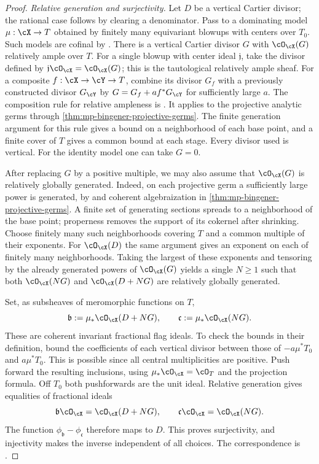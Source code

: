 \begin{proof}
\emph{Relative generation and surjectivity.}
Let $D$ be a vertical Cartier divisor; the rational case
follows by clearing a denominator. Pass to a dominating
model $\mu:\cX\to T$ obtained by finitely many equivariant
blowups with centers over $T_0$. Such models are cofinal
by \cite[Remark~2.5.2 and the proof of Theorem~2.6.4,
footnote~10]{MPTropicalV2}.
There is a vertical Cartier divisor $G$ with
$\cO_{\cX}(G)$ relatively ample over $T$. For a single
blowup with center ideal $\mathfrak j$, take the divisor
defined by $\mathfrak j\cO_{\cX}=\cO_{\cX}(G)$; this
is the tautological relatively ample sheaf. For a composite
$f:\cX\to\cY\to T$, combine its divisor $G_f$
with a previously constructed divisor $G_{\cY}$ by
$G=G_f+a f^*G_{\cY}$ for sufficiently large $a$.
The composition rule for relative ampleness is
\cite[Tag~0C4K]{stacks-project}. It applies to the projective
analytic germs through
\cref{thm:mp-bingener-projective-germs}. The finite generation
argument for this rule gives a bound on a neighborhood of
each base point, and a finite cover of $T$ gives a common
bound at each stage. Every divisor used is vertical. For
the identity model one can take $G=0$.

After replacing $G$ by a positive multiple, we may also
assume that $\cO_{\cX}(G)$ is relatively globally generated.
Indeed, on each projective germ a sufficiently large power
is generated, by \cite[Tag~01Q3, assertion~(7)]{stacks-project}
and coherent algebraization in
\cref{thm:mp-bingener-projective-germs}. A finite set of
generating sections spreads to a neighborhood of the base
point; properness removes the support of its cokernel after
shrinking. Choose finitely many such neighborhoods covering
$T$ and a common multiple of their exponents. For
$\cO_{\cX}(D)$ the same argument gives an exponent on each
of finitely many neighborhoods. Taking the largest of
these exponents and tensoring by the already generated
powers of $\cO_{\cX}(G)$ yields a single $N\geq1$ such that
both $\cO_{\cX}(NG)$ and $\cO_{\cX}(D+NG)$ are relatively
globally generated.

Set, as subsheaves of meromorphic functions on $T$,
\[
 \mathfrak b:=\mu_*\cO_{\cX}(D+NG),\qquad
 \mathfrak c:=\mu_*\cO_{\cX}(NG).
\]
These are coherent invariant fractional flag ideals.
To check the bounds in their definition, bound the
coefficients of each vertical divisor between those of
$-a\mu^*T_0$ and $a\mu^*T_0$. This is possible since
all central multiplicities are positive. Push forward
the resulting inclusions, using
$\mu_*\cO_{\cX}=\cO_T$ and the projection formula.
Off $T_0$ both pushforwards are the unit ideal. Relative
generation gives equalities of fractional ideals
\[
 \mathfrak b\cO_{\cX}=\cO_{\cX}(D+NG),\qquad
 \mathfrak c\cO_{\cX}=\cO_{\cX}(NG).
\]
The function $\phi_{\mathfrak b}-\phi_{\mathfrak c}$
therefore maps to $D$. This proves surjectivity, and
injectivity makes the inverse independent of all choices.
The correspondence is \cite[Theorem~2.6.4]{MPTropicalV2}.
\end{proof}

